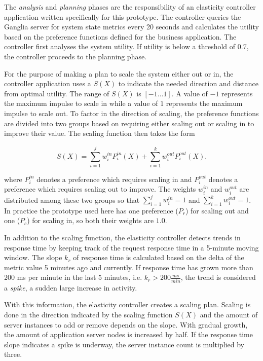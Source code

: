 \documentclass[english]{tktltiki2}
\theoremstyle{definition}
\theoremstyle{remark}
\begin{document}
The \textit{analysis} and \textit{planning} phases are the responsibility of an
elasticity controller application written specifically for this prototype. The
controller queries the Ganglia server for system state metrics every 20 seconds
and calculates the utility based on the preference functions defined for the
business application. The controller first analyses the system utility. If
utility is below a threshold of 0.7, the controller proceeds to the planning phase.

For the purpose of making a plan to scale the system either out or in, the
controller application uses a  $S(X)$ to indicate the
needed direction and distance from optimal utility. The range of $S(X)$ is
$[-1\dots1]$. A value of $-1$ represents the maximum impulse to scale in while a
value of $1$ represents the maximum impulse to scale out. To factor in the
direction of scaling, the preference functions are divided into two groups based
on requiring either scaling out or scaling in to improve their value.  The
scaling function then takes the form

\begin{equation}
S(X) = \sum\limits_{i=1}^j w_{i}^{in}P_{i}^{in}(X) + 
		\sum\limits_{i=1}^k w_{i}^{out}P_{i}^{out}(X).
\label{eq:scalingfunction}
\end{equation}

where $P_{i}^{in}$ denotes a preference which requires scaling in and
$P_{i}^{out}$ denotes a preference which requires scaling out to improve. The
weights $w_{i}^{in}$ and $w_{i}^{out}$ are distributed among these two groups so
that $\sum\limits_{i=1}^j w_{i}^{in} = 1$ and $\sum\limits_{i=1}^k w_{i}^{out} =
1$. In practice the prototype used here has one preference ($P_{r}$) for scaling out and one ($P_{c}$) for scaling in, so both their weights are $1.0$.

In addition to the scaling function, the elasticity controller detects trends in
response time by keeping track of the request response time in a 5-minute moving
window. The slope $k_{r}$ of response time is calculated based on the delta of
the metric value 5 minutes ago and currently. If response time has grown more
than 200 ms per minute in the last 5 minutes, i.e. $k_{r} > 200 \frac{ms}{min}$,
the trend is considered a \textit{spike}, a sudden large increase in activity.

With this information, the elasticity controller creates a scaling plan. Scaling
is done in the direction indicated by the scaling function $S(X)$ and the amount
of server instances to add or remove depends on the slope. With gradual growth,
the amount of application server nodes is increased by half. If the response
time slope indicates a spike is underway, the server instance count is
multiplied by three. 
\end{document}

